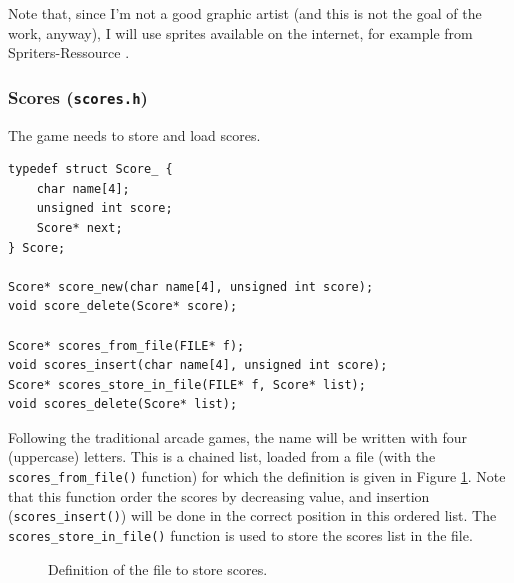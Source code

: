 \documentclass[12pt,a4paper]{article}
\begin{document}
Note that, since I'm not a good graphic artist (and this is not the goal of the work, anyway), I will use sprites available on the internet, for example from Spriters-Ressource \cite{spriters}.

\subsubsection{Scores (\texttt{scores.h})}

The game needs to store and load scores.

\begin{verbatim}
typedef struct Score_ {
	char name[4];
	unsigned int score;
	Score* next;
} Score;

Score* score_new(char name[4], unsigned int score);
void score_delete(Score* score);

Score* scores_from_file(FILE* f);
void scores_insert(char name[4], unsigned int score);
Score* scores_store_in_file(FILE* f, Score* list);
void scores_delete(Score* list);
\end{verbatim}

Following the traditional arcade games, the name will be written with four (uppercase) letters. This is a chained list, loaded from a file (with the \texttt{scores_from_file()} function) for which the definition is given in Figure \ref{fig:def:scores}. Note that this function order the scores by decreasing value, and insertion (\texttt{scores_insert()}) will be done in the correct position in this ordered list. The \texttt{scores_store_in_file()} function is used to store the scores list in the file.

\begin{figure}[!p]
	\centering
{}
\caption{Definition of the file to store scores.}
\label{fig:def:scores}
\end{figure} 
\end{document}
